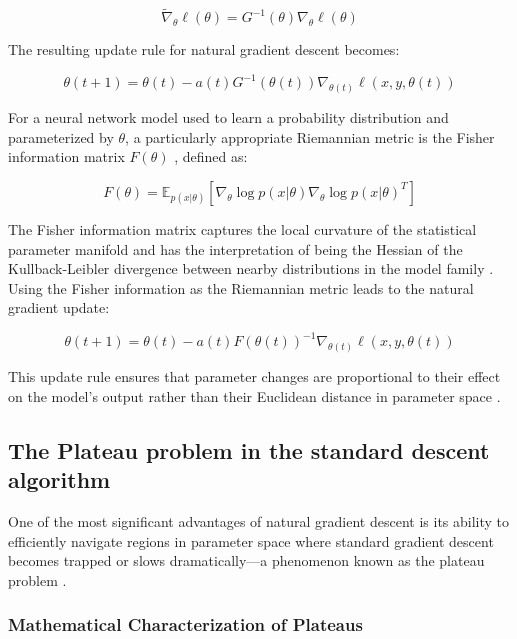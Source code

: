 \documentclass[a4paper]{article}
\begin{document}
\begin{equation}
\tilde{\nabla}_\theta \ell(\theta) = G^{-1}(\theta)\nabla_\theta \ell(\theta)
\end{equation}

The resulting update rule for natural gradient descent becomes:

\begin{equation}
\theta (t+1) = \theta (t) - a(t) G^{-1}(\theta(t)) \nabla_{\theta(t)} \ell (x,y,\theta(t))
\end{equation}

For a neural network model used to learn a probability distribution and parameterized by $\theta$, a particularly appropriate Riemannian metric is the Fisher information matrix $F(\theta)$ \cite{rao1945information, jeffreys1946invariant}, defined as:

\begin{equation}
F(\theta) = \mathbb{E}_{p(x|\theta)}\left[\nabla_\theta \log p(x|\theta) \nabla_\theta \log p(x|\theta)^T\right]
\end{equation}

The Fisher information matrix captures the local curvature of the statistical parameter manifold and has the interpretation of being the Hessian of the Kullback-Leibler divergence between nearby distributions in the model family \cite{amari2000methods}. Using the Fisher information as the Riemannian metric leads to the natural gradient update:

\begin{equation}
\theta(t+1) = \theta (t)- a(t)F(\theta(t))^{-1} \nabla_{\theta(t)} \ell (x,y,\theta(t))
\end{equation}

This update rule ensures that parameter changes are proportional to their effect on the model's output rather than their Euclidean distance in parameter space \cite{martens2010deep, martens2015optimizing}.

\subsection{The Plateau problem in the standard descent algorithm}

One of the most significant advantages of natural gradient descent is its ability to efficiently navigate regions in parameter space where standard gradient descent becomes trapped or slows dramatically—a phenomenon known as the plateau problem \cite{yang1998complexity}.

\subsubsection{Mathematical Characterization of Plateaus}
\end{document}
